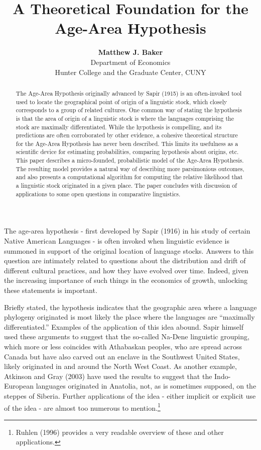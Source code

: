 \documentclass[11pt]{article}
\title{A Theoretical Foundation for the Age-Area Hypothesis}
\author{\textbf{Matthew J. Baker} \\ Department of Economics \\ Hunter College and the Graduate Center, CUNY}
\begin{document}
\maketitle
\begin{abstract}
\noindent The Age-Area Hypothesis originally advanced by Sapir (1915) is an often-invoked tool used to locate the geographical point of origin of a linguistic stock, which closely corresponds to a group of related cultures. One common way of stating the hypothesis
is that the area of origin of a linguistic stock is where the languages comprising the stock are maximally differentiated. While the hypothesis is compelling, and its predictions are often corroborated by other evidence, a cohesive theoretical structure for the Age-Area Hypothesis has never been described. This limits its usefulness as a scientific device for estimating probabilities, comparing hypothesis about origins, etc. This paper describes a micro-founded, probabilistic model of the Age-Area Hypothesis. The resulting model provides a natural way of describing more parsimonious outcomes, and also presents a computational algorithm for computing the relative likelihood that a linguistic stock originated in a given place. The paper concludes with discussion of applications to some open questions in comparative linguistics.
\end{abstract}
\newpage

\doublespacing

The age-area hypothesis - first developed by Sapir (1916) in his study of certain Native American Languages - is often invoked when linguistic
evidence is summoned in support of the original location of language stocks. Answers to this question are intimately related to questions about the distribution and drift of different cultural practices, and how they have evolved over time. Indeed, given the increasing importance of such things in the economics of growth, unlocking these statements is important. 

Briefly stated, the hypothesis indicates that the geographic area where a language phylogeny originated
is most likely the place where the languages are ``maximally differentiated.'' Examples of the application of this idea abound. Sapir himself used these arguments to suggest that the so-called Na-Dene linguistic grouping, which more or less coincides with Athabaskan peoples, who are spread across Canada but have also carved out an enclave in the Southwest United States, likely originated in and around the North West Coast. As another example, Atkinson and Gray (2003) have used the results to suggest that the Indo-European languages originated in Anatolia, not, as is sometimes supposed, on the steppes of Siberia. Further applications of the idea - either implicit or explicit use of the idea - are almost too numerous to mention.\footnote{Ruhlen (1996) provides a very readable overview of these and other applications.}
\end{document}
